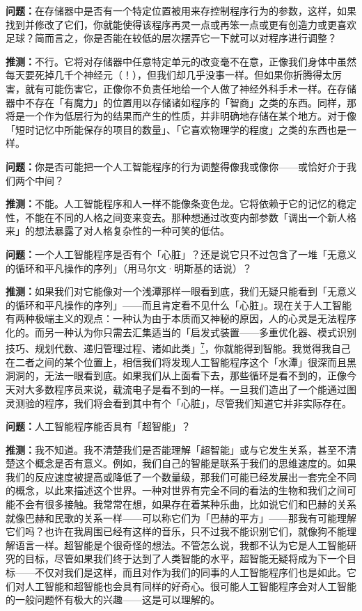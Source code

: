 \documentclass[
  12pt,
  twoside,
  openright,
  oldfontcommands,
]{memoir}
\newcommand{\dialogname}[1]{{\heifamily\bfseries #1}}
\begin{document}
\dialogname{问题：}在存储器中是否有一个特定位置被用来存控制程序行为的参数，这样，如果找到并修改了它们，你就能使得该程序再灵一点或再笨一点或更有创造力或更喜欢足球？简而言之，你是否能在较低的层次摆弄它一下就可以对程序进行调整？

\dialogname{推测：}不行。它将对存储器中任意特定单元的改变毫不在意，正像我们身体中虽然每天要死掉几千个神经元（！），但我们却几乎没事一样。但如果你折腾得太厉害，就有可能伤害它，正像你不负责任地给一个人做了神经外科手术一样。在存储器中不存在「有魔力」的位置用以存储诸如程序的「智商」之类的东西。同样，那将是一个作为低层行为的结果而产生的性质，并非明确地存储在某个地方。对于像「短时记忆中所能保存的项目的数量」、「它喜欢物理学的程度」之类的东西也是一样。

\dialogname{问题：}你是否可能把一个人工智能程序的行为调整得像我或像你------或恰好介于我们两个中间？

\dialogname{推测：}不能。人工智能程序和人一样不能像条变色龙。它将依赖于它的记忆的稳定性，不能在不同的人格之间变来变去。那种想通过改变内部参数「调出一个新人格来」的想法暴露了对人格复杂性的一种可笑的低估。

\dialogname{问题：}一个人工智能程序是否有个「心脏」？还是说它只不过包含了一堆「无意义的循环和平凡操作的序列」（用马尔文·明斯基的话说）？

\dialogname{推测：}如果我们对它能像对一个浅潭那样一眼看到底，我们无疑只能看到「无意义的循环和平凡操作的序列」------而且肯定看不见什么「心脏」。现在关于人工智能有两种极端主义的观点：一种认为由于本质而又神秘的原因，人的心灵是无法程序化的。而另一种认为你只需去汇集适当的「启发式装置------多重优化器、模式识别技巧、规划代数、递归管理过程、诸如此类」\hyperref[fn:Chapter19-7]{\textsuperscript{7}}，你就能得到智能。我觉得我自己在二者之间的某个位置上，相信我们将发现人工智能程序这个「水潭」很深而且黑洞洞的，无法一眼看到底。如果我们从上面看下去，那些循环是看不到的，正像今天对大多数程序员来说，载流电子是看不到的一样。一旦我们造出了一个能通过图灵测验的程序，我们将会看到其中有个「心脏」，尽管我们知道它并非实际存在。

\dialogname{问题：}人工智能程序能否具有「超智能」？

\dialogname{推测：}我不知道。我不清楚我们是否能理解「超智能」或与它发生关系，甚至不清楚这个概念是否有意义。例如，我们自己的智能是联系于我们的思维速度的。如果我们的反应速度被提高或降低了一个数量级，那我们可能已经发展出一套完全不同的概念，以此来描述这个世界。一种对世界有完全不同的看法的生物和我们之间可能不会有很多接触。我常常在想，如果存在着某种乐曲，比如说它们和巴赫的关系就像巴赫和民歌的关系一样------可以称它们为「巴赫的平方」------那我有可能理解它们吗？也许在我周围已经有这样的音乐，只不过我不能识别它们，就像狗不能理解语言一样。超智能是个很奇怪的想法。不管怎么说，我都不认为它是人工智能研究的目标，尽管如果我们终于达到了人类智能的水平，超智能无疑将成为下一个目标------不仅对我们是这样，而且对作为我们的同事的人工智能程序们也是如此。它们对人工智能和超智能也会具有同样的好奇心。很可能人工智能程序会对人工智能的一般问题怀有极大的兴趣------这是可以理解的。
\end{document}
